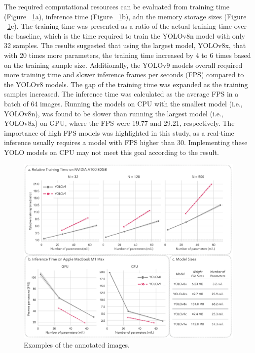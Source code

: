 The required computational resources can be evaluated from training time (Figure ~\ref{fig:resources}a), inference time (Figure ~\ref{fig:resources}b), adn the memory storage sizes (Figure ~\ref{fig:resources}c). The training time was presented as a ratio of the actual training time over the baseline, which is the time required to train the YOLOv8n model with only 32 samples. The results suggested that using the largest model, YOLOv8x, that with 20 times more parameters, the training time increased by 4 to 6 times based on the training sample size. Additionally, the YOLOv9 models overall required more training time and slower inference frames per seconds (FPS) compared to the YOLOv8 models. The gap of the training time was expanded as the training samples increased. The inference time was calculated as the average FPS in a batch of 64 images. Running the models on CPU with the smallest model (i.e., YOLOv8n), was found to be slower than running the largest model (i.e., YOLOv8x) on GPU, where the FPS were 19.77 and 29.21, respectively. The importance of high FPS models was highlighted in this study, as a real-time inference usually requires a model with FPS higher than 30. Implementing these YOLO models on CPU may not meet this goal according to the result.


\begin{figure}[H]
    \centering
    \includegraphics[width=1\textwidth]{figure_6.jpg}
    \caption{Examples of the annotated images.}
    \label{fig:resources}
\end{figure}


